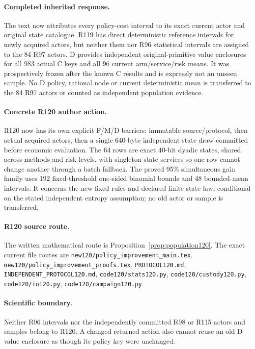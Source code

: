 \paragraph{Completed inherited response.}
The text now attributes every policy-cost interval to its exact current actor and original state catalogue. R119 has direct deterministic reference intervals for newly acquired actors, but neither them nor R96 statistical intervals are assigned to the 84 R97 actors. D provides independent original-primitive value enclosures for all 983 actual C keys and all 96 current arm/service/risk means. It was prospectively frozen after the known C results and is expressly not an unseen sample. No D policy, rational node or current deterministic mean is transferred to the 84 R97 actors or counted as independent population evidence.
\paragraph{Concrete R120 author action.}
R120 now has its own explicit F/M/D barriers: immutable source/protocol, then actual acquired actors, then a single 640-byte independent state draw committed before economic evaluation. The 64 rows are exact 40-bit dyadic states, shared across methods and risk levels, with singleton state services so one row cannot change another through a batch fallback. The proved 95\% simultaneous gain family uses 192 fixed-threshold one-sided binomial bounds and 48 bounded-mean intervals. It concerns the new fixed rules and declared finite state law, conditional on the stated independent entropy assumption; no old actor or sample is transferred.
\paragraph{R120 source route.}
The written mathematical route is Proposition~\ref{prop:population120}. The exact current file routes are \nolinkurl{new120/policy_improvement_main.tex}, \nolinkurl{new120/policy_improvement_proofs.tex}, \nolinkurl{PROTOCOL120.md}, \nolinkurl{INDEPENDENT_PROTOCOL120.md}, \nolinkurl{code120/stats120.py}, \nolinkurl{code120/custody120.py}, \nolinkurl{code120/io120.py}, \nolinkurl{code120/campaign120.py}.
\paragraph{Scientific boundary.}
Neither R96 intervals nor the independently committed R98 or R115 actors and samples belong to R120. A changed returned action also cannot reuse an old D value enclosure as though its policy key were unchanged.

